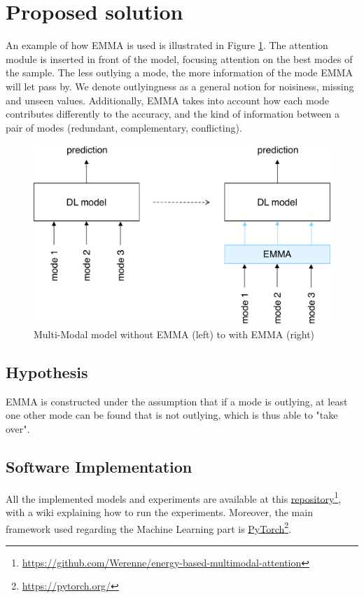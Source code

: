 \section{Proposed solution}
An example of how EMMA is used is illustrated in Figure \ref{fig:main-idea}. The attention module is inserted in front of the model, focusing attention on the best modes of the sample. The less outlying a mode, the more information of the mode EMMA will let pass by. We denote outlyingness as a general notion for noisiness, missing and unseen values. Additionally, EMMA takes into account how each mode contributes differently to the accuracy, and the kind of information between a pair of modes (redundant, complementary, conflicting).
\begin{figure}[!h]
\centering
\includegraphics[scale=0.45]{figures/introduction-three-modes-with-emma}
\caption{Multi-Modal model without EMMA (left) to with EMMA (right)}	
\label{fig:main-idea}
\end{figure}

\subsection*{Hypothesis}
EMMA is constructed under the assumption that if a mode is outlying, at least one other mode can be found that is not outlying, which is thus able to "take over".

\subsection*{Software Implementation}
All the implemented models and experiments are available at this \href{https://github.com/Werenne/energy-based-multimodal-attention}{repository}\footnote{\url{https://github.com/Werenne/energy-based-multimodal-attention}}, with a wiki explaining how to run the experiments. Moreover, the main framework used regarding the Machine Learning part is \href{https://pytorch.org/}{PyTorch}\footnote{\url{https://pytorch.org/}}.

